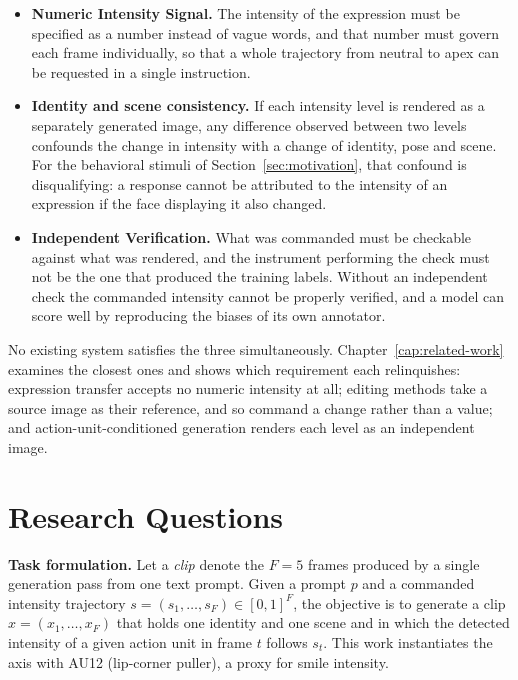 \begin{itemize}
    \item \textbf{Numeric Intensity Signal.} The intensity of the expression
    must be specified as a number instead of vague words, and that number must govern each frame
    individually, so that a whole trajectory from neutral to apex can be requested in a single
    instruction.

    \item \textbf{Identity and scene consistency.} If each intensity level is rendered as a separately
    generated image, any difference observed between two levels confounds the change in intensity with a change of identity, pose and scene. For the behavioral stimuli of
    Section~\ref{sec:motivation}, that confound is disqualifying: a response cannot be attributed
    to the intensity of an expression if the face displaying it also changed.

    \item \textbf{Independent Verification.} What was commanded must be checkable against
    what was rendered, and the instrument performing the check must not be the one that produced
    the training labels. Without an independent check the commanded intensity cannot be properly verified, and a model can score well by reproducing the biases of its
    own annotator.
\end{itemize}

No existing system satisfies the three simultaneously. Chapter~\ref{cap:related-work} examines
the closest ones and shows which requirement each relinquishes: expression transfer accepts no
numeric intensity at all; editing methods take a source image as their reference, and so command
a change rather than a value; and action-unit-conditioned generation renders each level as an
independent image.

\section{Research Questions}\label{sec:research-questions}


\noindent\textbf{Task formulation.} Let a \emph{clip} denote the $F=5$ frames produced by a
single generation pass from one text prompt. Given a prompt $p$ and a commanded intensity
trajectory $s=(s_1,\dots,s_F)\in[0,1]^F$, the objective is to generate a clip
$x=(x_1,\dots,x_F)$ that holds one identity and one scene and in which the detected intensity of
a given action unit in frame $t$ follows $s_t$. This work instantiates the axis with AU12
(lip-corner puller), a proxy for smile intensity.

